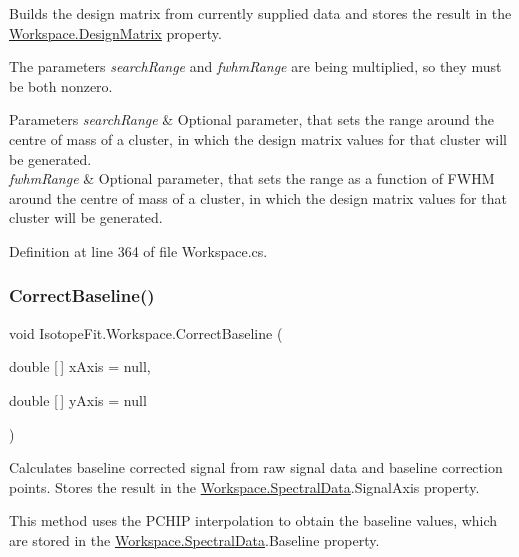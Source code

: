 Builds the design matrix from currently supplied data and stores the result in the \hyperlink{class_isotope_fit_1_1_workspace_ae24a2ee8f965fb2ed7ad3a592163271d}{Workspace.\+Design\+Matrix} property. 

The parameters {\itshape search\+Range}  and {\itshape fwhm\+Range}  are being multiplied, so they must be both nonzero.


\begin{DoxyParams}{Parameters}
{\em search\+Range} & Optional parameter, that sets the range around the centre of mass of a cluster, in which the design matrix values for that cluster will be generated.\\
\hline
{\em fwhm\+Range} & Optional parameter, that sets the range as a function of F\+W\+HM around the centre of mass of a cluster, in which the design matrix values for that cluster will be generated.\\
\hline
\end{DoxyParams}


Definition at line 364 of file Workspace.\+cs.

\mbox{\label{class_isotope_fit_1_1_workspace_aa0b81213937d49ae3a6183563cfe0f60}} 
\subsubsection{\texorpdfstring{Correct\+Baseline()}{CorrectBaseline()}}
{\footnotesize\ttfamily void Isotope\+Fit.\+Workspace.\+Correct\+Baseline (\begin{DoxyParamCaption}\item[{double \mbox{[}$\,$\mbox{]}}]{x\+Axis = {\ttfamily null},  }\item[{double \mbox{[}$\,$\mbox{]}}]{y\+Axis = {\ttfamily null} }\end{DoxyParamCaption})}



Calculates baseline corrected signal from raw signal data and baseline correction points. Stores the result in the \hyperlink{class_isotope_fit_1_1_workspace_a1d6cc2dd07cbfe920da9f1bffc9b32c2}{Workspace.\+Spectral\+Data}.Signal\+Axis property. 

This method uses the P\+C\+H\+IP interpolation to obtain the baseline values, which are stored in the \hyperlink{class_isotope_fit_1_1_workspace_a1d6cc2dd07cbfe920da9f1bffc9b32c2}{Workspace.\+Spectral\+Data}.Baseline property.


